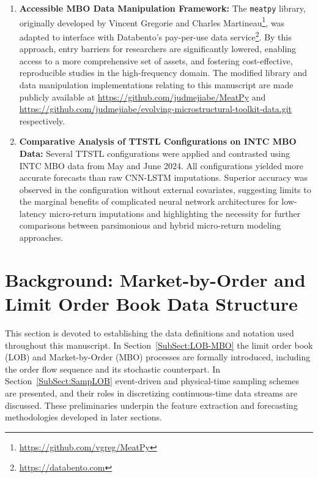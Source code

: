 \documentclass[10pt,a4paper,oneside]{article}
\begin{document}
\begin{enumerate}
    \item \textbf{Accessible MBO Data Manipulation Framework:} The \verb|meatpy| library, originally developed by Vincent Gregorie and Charles Martineau\footnote{\url{https://github.com/vgreg/MeatPy}}, was adapted to interface with Databento’s pay-per-use data service\footnote{\url{https://databento.com}}. By this approach, entry barriers for researchers are significantly lowered, enabling access to a more comprehensive set of assets, and fostering cost-effective, reproducible studies in the high-frequency domain. The modified library and data manipulation implementations relating to this manuscript are made publicly available at \url{https://github.com/judmejiabe/MeatPy} and \url{https://github.com/judmejiabe/evolving-microstructural-toolkit-data.git} respectively.

    \item \textbf{Comparative Analysis of TTSTL Configurations on INTC MBO Data:} Several TTSTL configurations were applied and contrasted using INTC MBO data from May and June 2024. All configurations yielded more accurate forecasts than raw CNN-LSTM imputations. Superior accuracy was observed in the configuration without external covariates, suggesting limits to the marginal benefits of complicated neural network architectures for low-latency micro-return imputations and highlighting the necessity for further comparisons between parsimonious and hybrid micro-return modeling approaches.
\end{enumerate}


\section{Background: Market-by-Order and Limit Order Book Data Structure}
\label{Sect:BckGrnd}
This section is devoted to establishing the data definitions and notation used throughout this manuscript.  In Section~\ref{SubSect:LOB-MBO} the limit order book (LOB) and Market-by-Order (MBO) processes are formally introduced, including the order flow sequence and its stochastic counterpart.  In Section~\ref{SubSect:SampLOB} event-driven and physical-time sampling schemes are presented, and their roles in discretizing continuous-time data streams are discussed.  These preliminaries underpin the feature extraction and forecasting methodologies developed in later sections.
\end{document}
